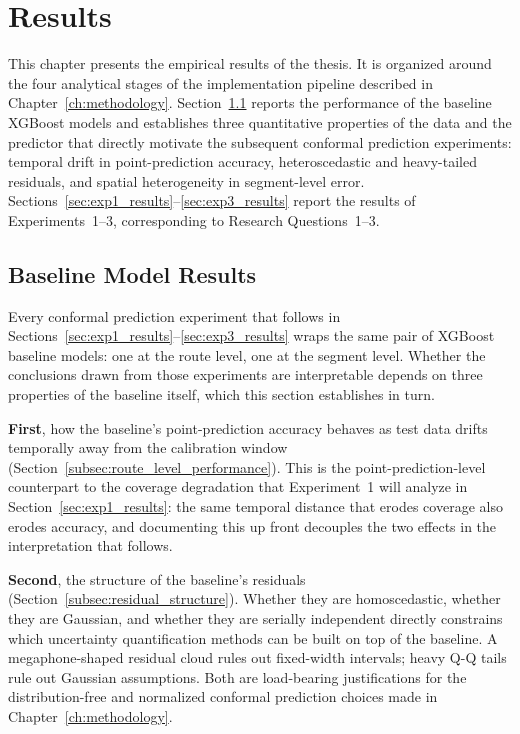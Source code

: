 
\chapter{Results}
\label{ch:results}

This chapter presents the empirical results of the thesis. It is organized around the four analytical stages of the implementation pipeline described in Chapter~\ref{ch:methodology}. Section~\ref{sec:baseline_results} reports the performance of the baseline XGBoost models and establishes three quantitative properties of the data and the predictor that directly motivate the subsequent conformal prediction experiments: temporal drift in point-prediction accuracy, heteroscedastic and heavy-tailed residuals, and spatial heterogeneity in segment-level error. Sections~\ref{sec:exp1_results}--\ref{sec:exp3_results} report the results of Experiments~1--3, corresponding to Research Questions~1--3.

\section{Baseline Model Results}
\label{sec:baseline_results}

Every conformal prediction experiment that follows in Sections~\ref{sec:exp1_results}--\ref{sec:exp3_results} wraps the same pair of XGBoost baseline models: one at the route level, one at the segment level. Whether the conclusions drawn from those experiments are interpretable depends on three properties of the baseline itself, which this section establishes in turn.

\textbf{First}, how the baseline's point-prediction accuracy behaves as test data drifts temporally away from the calibration window (Section~\ref{subsec:route_level_performance}). This is the point-prediction-level counterpart to the coverage degradation that Experiment~1 will analyze in Section~\ref{sec:exp1_results}: the same temporal distance that erodes coverage also erodes accuracy, and documenting this up front decouples the two effects in the interpretation that follows.

\textbf{Second}, the structure of the baseline's residuals (Section~\ref{subsec:residual_structure}). Whether they are homoscedastic, whether they are Gaussian, and whether they are serially independent directly constrains which uncertainty quantification methods can be built on top of the baseline. A megaphone-shaped residual cloud rules out fixed-width intervals; heavy Q-Q tails rule out Gaussian assumptions. Both are load-bearing justifications for the distribution-free and normalized conformal prediction choices made in Chapter~\ref{ch:methodology}.

